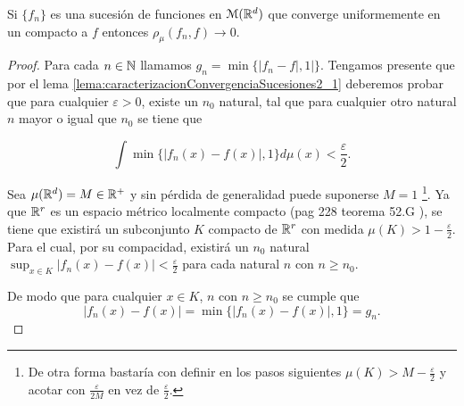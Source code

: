 \begin{lema} \label{lema:2_2_convergencia_uniforme_en_compactos}  
    Si $\{f_n\}$ es una sucesión de funciones en $\mathcal{M}(\mathbb{R}^d)$ que converge
    uniformemente en un compacto a $f$ entonces $\rho_{\mu}(f_n, f) \longrightarrow 0$. 
\end{lema}  
\begin{proof} Para cada $n\in \mathbb{N}$ llamamos $g_n = \min\{|f_n - f|, 1|\}$.
    Tengamos presente que por el  lema \ref{lema:caracterizacionConvergenciaSucesiones2_1} 
    deberemos probar que para cualquier $\varepsilon > 0$, 
    existe un $n_0$ natural, tal que para cualquier otro natural $n$ mayor o igual que $n_0$ se tiene que 

    \begin{equation}
        \int \min \{ |f_n(x) - f(x)|, 1\} d\mu(x) 
        < 
        \frac{\varepsilon}{2}.
    \end{equation}  

    Sea $\mu(\mathbb{R}^d) = M \in \mathbb{R}^+$  y 
    sin pérdida de generalidad puede suponerse $M = 1$
     \footnote{De otra forma bastaría con definir 
    en los pasos siguientes $\mu(K) > M - \frac{\varepsilon}{2}$ y acotar con $\frac{\varepsilon}{2M}$ 
    en vez de $\frac{\varepsilon}{2}$.}. 
    Ya que $\mathbb{R}^r$ es un espacio métrico localmente compacto
    (pag 228 teorema 52.G \cite{nla.cat-vn1819421}),
    se tiene que existirá un subconjunto $K$ compacto de $\mathbb{R}^r$ con medida $\mu(K) > 1 - \frac{\varepsilon}{2}.$
    Para el cual, por su compacidad, existirá un  $n_0$ natural 
    $\sup_{x \in K} |f_n(x) - f(x)| < \frac{\varepsilon}{2}$   
    para cada natural $n$ con $n\geq n_0.$ 
    
    De modo que para cualquier $x \in K$, 
     $n$ con $n\geq n_0$   se cumple que 
     \begin{equation}
        |f_n(x) - f(x)| 
        = 
        \min \{ |f_n(x) - f(x)|, 1\} 
        = 
        g_n.
     \end{equation}


\end{proof}
